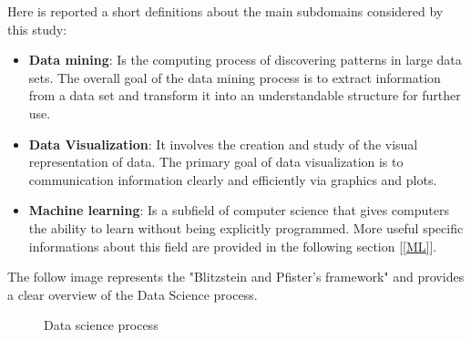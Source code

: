 Here is reported a short definitions about the main subdomains considered by this study:
\begin{itemize}

\item \textbf{Data mining}: Is the computing process of discovering patterns in large data sets. The overall goal of the data mining process is to extract information from a data set and transform it into an understandable structure for further use.

\item \textbf{Data Visualization}: It involves the creation and study of the visual representation of data. The primary goal of data visualization is to communication information clearly and efficiently via graphics and plots.

\item \textbf{Machine learning}: Is a subfield of computer science that gives computers the ability to learn without being explicitly programmed.\cite{ArthurSamuel} More useful specific informations about this field are provided in the following section [\ref{ML}].
\end{itemize}

The follow image represents the "Blitzstein and Pfister's framework" and provides a clear overview of the Data Science process.
\begin{figure}[H]
    \centering
    \caption[Data science process]{Data science process}
    \label{fig: Data_science_process}
\end{figure}



